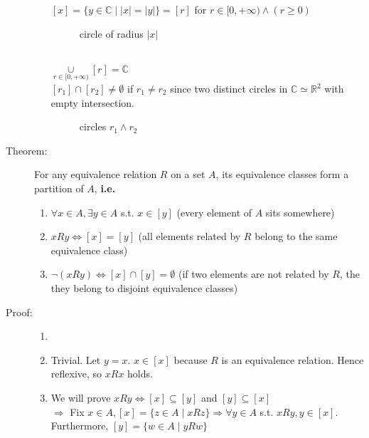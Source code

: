 \documentclass[10pt]{article}
\begin{document}
\begin{description}
\begin{enumerate}
			$[x] = \{y \in \mathbb{C} \mid |x|=|y| \} = [r]$ for $r \in [0, +\infty) \land (r \geq 0)$ \\
			\begin{figure}[h]
				\centering
				\caption*{circle of radius $|x|$}
			\end{figure}
			\\
			$\underset{r \in [0, +\infty)}{\cup} [r] = \mathbb{C}$ \\
			$[r_1] \cap [r_2] \neq \emptyset$ if $r_1 \neq r_2$ since two distinct circles in $\mathbb{C} \simeq \mathbb{R}^2$ with empty intersection.
			\pagebreak
			\begin{figure}[h]
				\centering
				\caption*{circles $r_1 \land r_2$}
			\end{figure}
		\end{enumerate}
		\item[Theorem:] For any equivalence relation $R$ on a set $A$, its equivalence classes form a partition of $A$, \textbf{i.e.}
		\begin{enumerate}
			\item $\forall x \in A, \exists y \in A$ s.t. $x \in [y]$ (every element of $A$ sits somewhere)
			\item $xRy \Leftrightarrow [x]=[y]$ (all elements related by $R$ belong to the same equivalence class)
			\item $\lnot (xRy) \Leftrightarrow [x] \cap [y] = \emptyset$ (if two elements are not related by $R$, the they belong to disjoint equivalence classes)
		\end{enumerate}
		\item[Proof:]
		\begin{enumerate}
			\item[]
			\item Trivial. Let $y=x$. $x \in [x]$ because $R$ is an equivalence relation. Hence reflexive, so $xRx$ holds.
			\item We will prove $xRy \Leftrightarrow [x] \subseteq [y]$ and $[y] \subseteq [x]$ \\
			$\Rightarrow$ Fix $x \in A, [x] = \{z \in A \mid xRz \} \Rightarrow \forall y \in A$ s.t. $xRy, y \in [x]$. Furthermore, $[y] = \{w \in A \mid yRw \}$ \\

\end{enumerate}
\end{description}
\end{document}
